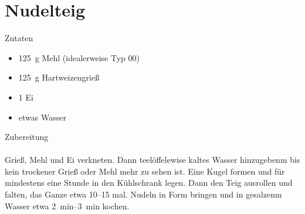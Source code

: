 \section*{Nudelteig}
\ihead{}\ohead{}
\cfoot{}
{\Large Zutaten}
\begin{multicols}{2}
\begin{itemize}
    \item \SI{125}{g} Mehl (idealerweise Typ 00)
    \item \SI{125}{g} Hartweizengrieß
    \item \num{1} Ei
    \item etwas Wasser
\end{itemize}
\end{multicols}
\noindent
{\Large Zubereitung}\\
\\
Grieß, Mehl und Ei verkneten. 
Dann teelöffelewise kaltes Wasser hinzugebenm bis kein trockener Grieß oder Mehl mehr zu sehen ist. 
Eine Kugel formen und für mindestens eine Stunde in den Kühlschrank legen.
Dann den Teig ausrollen und falten, das Ganze etwa \numrange{10}{15} mal.
Nudeln in Form bringen und in gesalzenm Wasser etwa \SIrange{2}{3}{min} kochen.